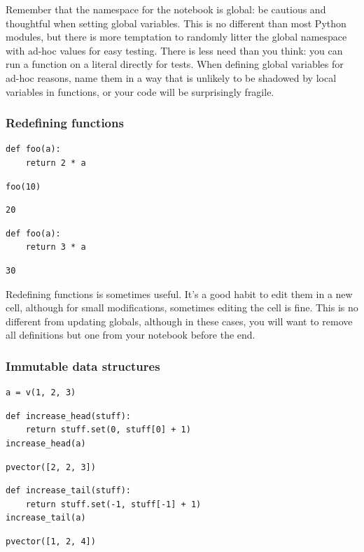 Remember that the namespace for the notebook is global:
be cautious and thoughtful when setting global variables.
This is no different than most Python modules,
but there is more temptation to randomly litter the global
namespace with ad-hoc values for easy testing.
There is less need than you think:
you can run a function on a literal directly for tests.
When defining global variables for ad-hoc reasons,
name them in a way that is unlikely to be shadowed
by local variables in functions,
or your code will be surprisingly fragile.

\begin{frame}[fragile]
\frametitle{Redefining functions}

\begin{lstlisting}[frame=single]
def foo(a):
    return 2 * a
\end{lstlisting}

\begin{lstlisting}[frame=single]
foo(10)
\end{lstlisting}

\begin{lstlisting}[frame=single]
20
\end{lstlisting}

\begin{lstlisting}[frame=single]
def foo(a):
    return 3 * a
\end{lstlisting}

\begin{lstlisting}[frame=single]
30
\end{lstlisting}

\end{frame}

Redefining functions is sometimes useful.
It's a good habit to edit them in a new cell,
although for small modifications,
sometimes editing the cell is fine.
This is no different from updating globals,
although in these cases,
you will want to remove all definitions
but one from your notebook before the end.

\begin{frame}[fragile]
\frametitle{Immutable data structures}

\begin{lstlisting}[frame=single]
a = v(1, 2, 3)
\end{lstlisting}

\begin{lstlisting}[frame=single]
def increase_head(stuff):
    return stuff.set(0, stuff[0] + 1)
increase_head(a)
\end{lstlisting}

\begin{lstlisting}[frame=single]
pvector([2, 2, 3])
\end{lstlisting}

\begin{lstlisting}[frame=single]
def increase_tail(stuff):
    return stuff.set(-1, stuff[-1] + 1)
increase_tail(a)
\end{lstlisting}

\begin{lstlisting}[frame=single]
pvector([1, 2, 4])
\end{lstlisting}

\end{frame}

